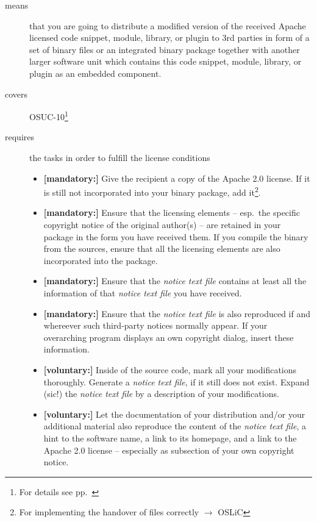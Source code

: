\begin{description}
\item[means] that you are going to distribute a modified version of the received
Apache licensed code snippet, module, library, or plugin to 3rd parties in form
of a set of binary files or an integrated binary package together with another
larger software unit which contains this code snippet, module, library, or
plugin as an embedded component.
\item[covers] OSUC-10\footnote{For details see pp.\ \pageref{OSUC-10-DEF}}
\item[requires] the tasks in order to fulfill the license conditions
\begin{itemize}
  
  \item \textbf{[mandatory:]} Give the recipient a copy of the Apache 2.0
  license. If it is still not incorporated into your binary package, add
  it\footnote{For implementing the handover of files correctly $\rightarrow$
  OSLiC \pageref{DistributingFilesHint}}.
  
  \item \textbf{[mandatory:]} Ensure that the licensing elements -- esp.\ the
  specific copyright notice of the original author(s) -- are retained in your
  package in the form you have received them. If you compile the binary from the
  sources, ensure that all the licensing elements are also incorporated into the
  package.
  
  \item \textbf{[mandatory:]} Ensure that the \emph{notice text file} contains at least
  all the information of that \emph{notice text file} you have received.
 
  \item \textbf{[mandatory:]} Ensure that the \emph{notice text file} is also
  reproduced if and whereever such third-party notices normally appear. If your
  overarching program displays an own copyright dialog, insert these
  information.
     
  \item \textbf{[voluntary:]} Inside of the source code, mark all your
  modifications thoroughly. Generate a \emph{notice text file}, if it still does not
  exist. Expand (sic!) the \emph{notice text file} by a description of your
  modifications.
 
  \item \textbf{[voluntary:]} Let the documentation of your distribution and/or
  your additional material also reproduce the content of the \emph{notice text
  file}, a hint to the software name, a link to its homepage, and a link to the
  Apache 2.0 license -- especially as subsection of your own copyright notice.
  


\end{itemize}
\end{description}
